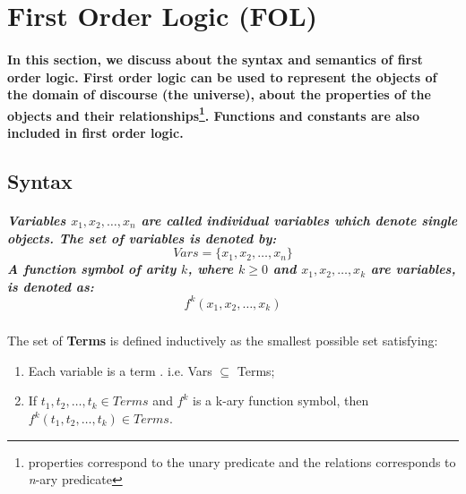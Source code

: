 \section{First Order Logic (FOL)}
\label{sec:preliminaries_FOL}
\paragraph*{\textnormal{In this section, we discuss about the syntax and semantics of first order logic. First order logic can be used to represent the objects of the domain of discourse (the universe), about the properties of the objects and their relationships\footnote{properties correspond to the unary predicate and the relations corresponds to \textit{n}-ary predicate}. Functions and constants are also included in first order logic.}}

\subsection*{Syntax}
\subparagraph*{\textnormal{Variables $x_{1},x_{2},\ldots,x_{n}$ are called individual variables which denote single objects. The set of variables is denoted by:
		\begin{equation*}
		Vars = \{x_{1},x_{2},\ldots,x_{n}\}
		\end{equation*}
		A function symbol of arity $k$, where $k \geq 0$ and $x_{1},x_{2},\ldots,x_{k}$ are variables, is denoted as:
		\begin{equation*}
		f^{k}(x_{1},x_{2},\ldots,x_{k})
		\end{equation*}
}}

\begin{defs}
	The set of \textbf{Terms} is defined inductively as the smallest possible set satisfying:
	\begin{enumerate}
		\item Each variable is a term . i.e. Vars $\subseteq$ Terms;
		\item If $t_{1},t_{2},\ldots,t_{k} \in Terms$ and $f^{k}$ is a k-ary function symbol, then $f^k(t_{1},t_{2},\ldots,t_{k}) \in Terms$.
	\end{enumerate}	 
\end{defs}

